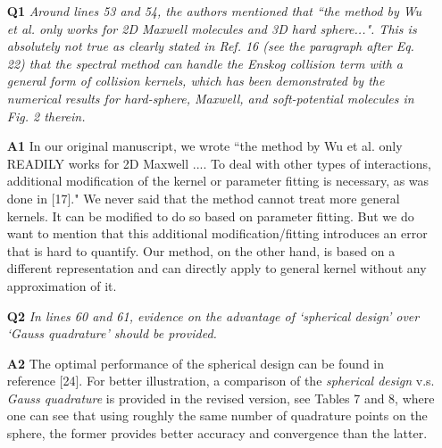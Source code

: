 \documentclass[11pt]{article}
\newcommand{\mz}[1]{\textcolor{blue}{MZ: #1}}
\begin{document}
\begin{itemize}
\item[{\bf Q1}]  {\it Around lines 53 and 54, the authors mentioned that ``the method by Wu et al. only works for 2D Maxwell molecules and 3D hard sphere...". This is absolutely not true as clearly stated in Ref. 16 (see the paragraph after Eq. 22) that the spectral method can handle the Enskog collision term with a general form of collision kernels, which has been demonstrated by the numerical results for hard-sphere, Maxwell, and soft-potential molecules in Fig. 2 therein.}

\item[{\bf A1}] In our original manuscript, we wrote ``the method by Wu et al. only {READILY} works for 2D Maxwell .... To deal with other types of interactions, additional modification of the kernel or parameter fitting is necessary, as was done in [17]." We never said that the method cannot treat more general kernels. It can be modified to do so based on parameter fitting. But we do want to mention that this additional modification/fitting introduces an error that is hard to quantify. Our method, on the other hand, is based on a different representation and can directly apply to general kernel without any approximation of it.


\item[{\bf Q2}] {\it In lines 60 and 61, evidence on the advantage of `spherical design' over `Gauss quadrature' should be provided.}

\item[{\bf A2}] The optimal performance of the spherical design can be found in reference [24]. For better illustration, a comparison of the {\it spherical design} v.s. {\it Gauss quadrature} is provided in the revised version, see Tables 7 and 8, where one can see that using roughly the same number of quadrature points on the sphere, the former provides better accuracy and convergence than the latter.


\end{itemize}
\end{document}
